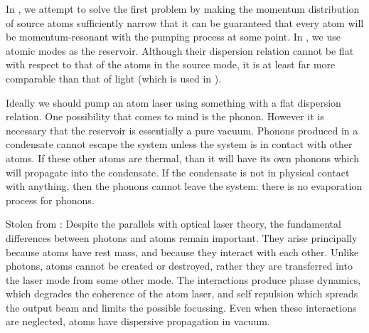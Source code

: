In , we attempt to solve the first problem by making the momentum distribution of source atoms sufficiently narrow that it can be guaranteed that every atom will be momentum-resonant with the pumping process at some point.  In , we use atomic modes as the reservoir.  Although their dispersion relation cannot be flat with respect to that of the atoms in the source mode, it is at least far more comparable than that of light (which is used in ).

Ideally we should pump an atom laser using something with a flat dispersion relation.  One possibility that comes to mind is the phonon.  However it is necessary that the reservoir is essentially a pure vacuum.  Phonons produced in a condensate cannot escape the system unless the system is in contact with other atoms.  If these other atoms are thermal, than it will have its own phonons which will propagate into the condensate.  If the condensate is not in physical contact with anything, then the phonons cannot leave the system: there is no evaporation process for phonons.

Stolen from \citep{Ballagh:2000oq}:
Despite the parallels with optical laser theory, the fundamental differences between photons and atoms remain important. They arise principally because atoms have rest mass, and because they interact with each other. Unlike photons, atoms cannot be created or destroyed, rather they are transferred into the laser mode from some other mode. The interactions produce phase dynamics, which degrades the coherence of the atom laser, and self repulsion which spreads the output beam and limits the possible focussing. Even when these interactions are neglected, atoms have dispersive propagation in vacuum.
